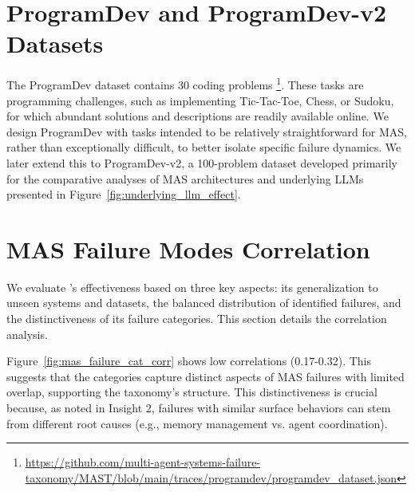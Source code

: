 \newpage



\section{ProgramDev and ProgramDev-v2 Datasets}
\label{sec:programdev}

The ProgramDev dataset contains 30 coding problems \footnote{\url{https://github.com/multi-agent-systems-failure-taxonomy/MAST/blob/main/traces/programdev/programdev_dataset.json}}. These tasks are programming challenges, such as implementing Tic-Tac-Toe, Chess, or Sudoku, for which abundant solutions and descriptions are readily available online. We design ProgramDev with tasks intended to be relatively straightforward for MAS, rather than exceptionally difficult, to better isolate specific failure dynamics. We later extend this to ProgramDev-v2, a 100-problem dataset developed primarily for the comparative analyses of MAS architectures and underlying LLMs presented in Figure~\ref{fig:underlying_llm_effect}.

\newpage
\section{MAS Failure Modes Correlation}
\label{appendix:mas-failure-modes-corr}
We evaluate \taxonomy{}'s effectiveness based on three key aspects: its generalization to unseen systems and datasets, the balanced distribution of identified failures, and the distinctiveness of its failure categories. This section details the correlation analysis. 


Figure~\ref{fig:mas_failure_cat_corr} shows low correlations (0.17-0.32). This suggests that the categories capture distinct aspects of MAS failures with limited overlap, supporting the taxonomy's structure. This distinctiveness is crucial because, as noted in Insight 2, failures with similar surface behaviors can stem from different root causes (e.g., memory management vs. agent coordination). 

